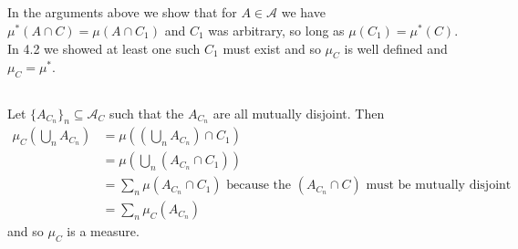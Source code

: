 \documentclass{unswmaths}
\begin{document}
\subsection{}

In the arguments above we show that for $ A \in \mathcal{A} $ we have $ \mu^*(A \cap C) = \mu(A \cap C_1) $ and $ C_1 $ was arbitrary, so long as $ \mu(C_1) = \mu^*(C) $. In 4.2 we showed at least one such $ C_1 $ must exist and so $ \mu_C $ is well defined and $ \mu_C = \mu^* $. 
\subsection{}
Let $ \{ A_{C_n} \}_n \subseteq \mathcal{A}_C $ such that the $ A_{C_n} $ are all mutually disjoint. Then
\begin{align*}
    \mu_C\left( \bigcup_n A_{C_n} \right) &= \mu\left( \left( \bigcup_n A_{C_n} \right) \cap C_1 \right) \\
        &=  \mu\left( \bigcup_n (A_{C_n} \cap C_1) \right) \\
        &= \sum_n \mu(A_{C_n} \cap C_1) \text{ because the } (A_{C_n} \cap C) \text{ must be mutually disjoint }\\
        &= \sum_n \mu_C ( A_{C_n})
\end{align*}
and so $ \mu_C $ is a measure. 
\end{document}

